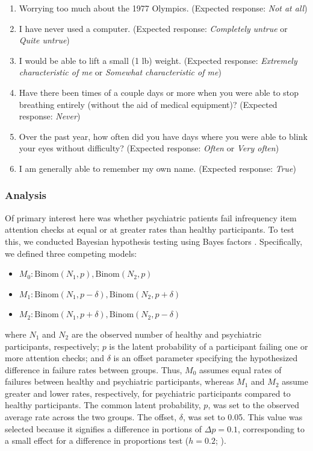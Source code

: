 \documentclass[a4paper,notitlepage,12pt]{article}
\begin{document}
\begin{enumerate}
    \item Worrying too much about the 1977 Olympics. (Expected response: \textit{Not at all})
    \item I have never used a computer. (Expected response: \textit{Completely untrue} or \textit{Quite untrue})
    \item I would be able to lift a small (1 lb) weight. (Expected response: \textit{Extremely characteristic of me} or \textit{Somewhat characteristic of me})
    \item Have there been times of a couple days or more when you were able to stop breathing entirely (without the aid of medical equipment)? (Expected response: \textit{Never})
    \item Over the past year, how often did you have days where you were able to blink your eyes without difficulty? (Expected response: \textit{Often} or \textit{Very often})
    \item I am generally able to remember my own name. (Expected response: \textit{True})
\end{enumerate}

\subsubsection*{Analysis}

Of primary interest here was whether psychiatric patients fail infrequency item attention checks at equal or at greater rates than healthy participants. To test this, we conducted Bayesian hypothesis testing using Bayes factors \cite{harms2018making}. Specifically, we defined three competing models:

\begin{itemize}
    \item $M_0: \text{Binom}(N_1, p), \text{Binom}(N_2, p)$  
    \item $M_1: \text{Binom}(N_1, p - \delta), \text{Binom}(N_2, p + \delta)$  
    \item $M_2: \text{Binom}(N_1, p + \delta), \text{Binom}(N_2, p - \delta)$  
\end{itemize}

where $N_1$ and $N_2$ are the observed number of healthy and psychiatric participants, respectively; $p$ is the latent probability of a participant failing one or more attention checks; and $\delta$ is an offset parameter specifying the hypothesized difference in failure rates between groups. Thus, $M_0$ assumes equal rates of failures between healthy and psychiatric participants, whereas $M_1$ and $M_2$  assume greater and lower rates, respectively, for psychiatric participants compared to healthy participants. The common latent probability, $p$, was set to the observed average rate across the two groups. The offset, $\delta$, was set to 0.05. This value was selected because it signifies a difference in portions of $\Delta p = 0.1$, corresponding to a small effect for a difference in proportions test ($h = 0.2$; \cite{cohen2013statistical}). 
\end{document}
